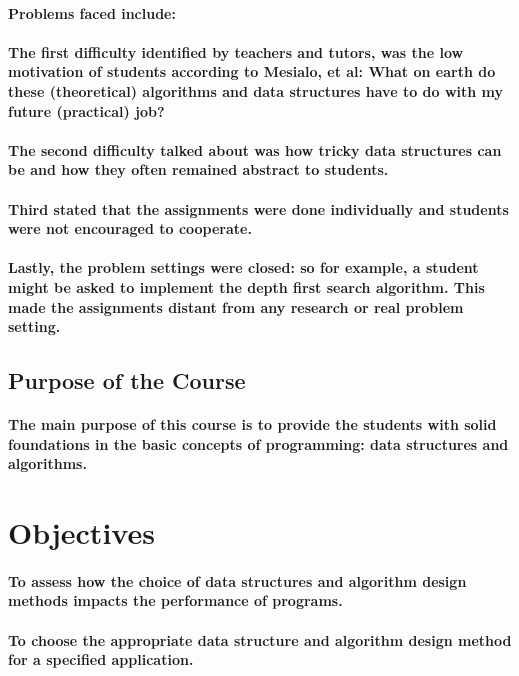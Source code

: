\documentclass{article}
\begin{document}
\paragraph{Problems faced include:}
\paragraph{\cite{patel2014literature}The first difficulty identified by teachers and tutors, was the low motivation of students according to Mesialo, et al: What on earth do these (theoretical) algorithms and data structures have to do with my future (practical) job? }
\paragraph{The second difficulty talked about was how tricky data structures can be and how they often remained abstract to students. }
\paragraph{Third stated that the assignments were done individually and students were not encouraged to cooperate. }
\paragraph{Lastly, the problem settings were closed: so for example, a student might be asked to implement the depth first search algorithm. This made the assignments distant from any research or real problem setting.}
\subsection{Purpose of the Course}
\paragraph{The main purpose of this course is to provide the students with solid foundations in the basic concepts of programming: data structures and algorithms.}
\section{Objectives}
\paragraph{To assess how the choice of data structures and algorithm design methods impacts the performance of programs.}
\paragraph{To choose the appropriate data structure and algorithm design method for a specified application. }
\end{document}
